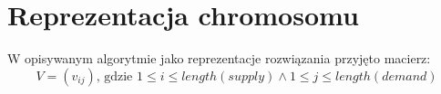 



\section{Reprezentacja chromosomu}
W opisywanym algorytmie jako reprezentacje rozwiązania przyjęto macierz:
$$V = (v_{ij}) \text{, gdzie } 1 \le i \le length(supply) \land 1 \le j \le length(demand)$$

